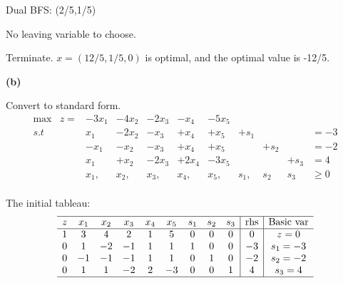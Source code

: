 \documentclass[12pt]{article}
\begin{document}
Dual BFS: (2/5,1/5)

No leaving variable to choose.

Terminate. $x=(12/5,1/5,0)$ is optimal, and the optimal value is -12/5.

\noindent
\textbf{(b)}

Convert to standard form.
\begin{equation*}
  \begin{array}{ccccccccccc}
    \text{max}& z= &    -3x_1      & -4x_2   & -2x_3 & -x_4   & -5x_5 & & &       \\ 
    s.t       &    &    x_1      &   -2x_2 &    -x_3 & +x_4                 &  +x_5 & +s_1 & & & =-3              \\
              &    &    -x_1      &   -x_2 &    -x_3 & +x_4                 &  +x_5 &  & +s_2 & & =-2              \\
              &    &    x_1      &    + x_2 & -2x_3    & +2x_4    & -3x_5 & & & +s_3 &           = 4          \\
              &    &    x_1,      &    x_2, & x_3, & x_4, & x_5, &   s_1, &    s_2  & s_3 &             \ge 0\\ 
  \end{array}
\end{equation*}

The initial tableau:
\begin{equation*}
  \begin{array}{ccccccccc|c|c}
    \hline
    z &  x_1      &  x_2 &  x_3 & x_4 & x_5 & s_1 & s_2 & s_3 &  \text{rhs} & \text{Basic var}  \\ \hline
    1 &    3      &    4 &    2 &    1 & 5    & 0 & 0 & 0 &     0  &  z=0              \\
    0 &    1      &    -2 &    -1 &    1 &    1 & 1 & 0 & 0 & -3      &  s_1 = -3          \\
    0 &    -1      &    -1 &    -1 &    1 &    1 & 0 & 1 & 0 & -2   &  s_2 = -2          \\ 
    0 &    1      &    1 &    -2 &    2 &    -3 & 0 & 0 & 1 & 4   &  s_3 = 4          \\ \hline
  \end{array}
\end{equation*}
\end{document}

